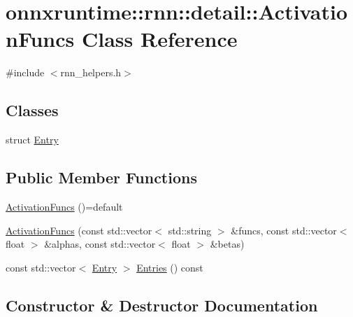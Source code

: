 \hypertarget{classonnxruntime_1_1rnn_1_1detail_1_1ActivationFuncs}{}\section{onnxruntime\+:\+:rnn\+:\+:detail\+:\+:Activation\+Funcs Class Reference}
\label{classonnxruntime_1_1rnn_1_1detail_1_1ActivationFuncs}


{\ttfamily \#include $<$rnn\+\_\+helpers.\+h$>$}

\subsection*{Classes}
\begin{DoxyCompactItemize}
\item 
struct \mbox{\hyperlink{structonnxruntime_1_1rnn_1_1detail_1_1ActivationFuncs_1_1Entry}{Entry}}
\end{DoxyCompactItemize}
\subsection*{Public Member Functions}
\begin{DoxyCompactItemize}
\item 
\mbox{\hyperlink{classonnxruntime_1_1rnn_1_1detail_1_1ActivationFuncs_ad6498706d5d6739ca3163f313fba59e2}{Activation\+Funcs}} ()=default
\item 
\mbox{\hyperlink{classonnxruntime_1_1rnn_1_1detail_1_1ActivationFuncs_aa49e05e7eabe9da56ef58334cbc2b685}{Activation\+Funcs}} (const std\+::vector$<$ std\+::string $>$ \&funcs, const std\+::vector$<$ float $>$ \&alphas, const std\+::vector$<$ float $>$ \&betas)
\item 
const std\+::vector$<$ \mbox{\hyperlink{structonnxruntime_1_1rnn_1_1detail_1_1ActivationFuncs_1_1Entry}{Entry}} $>$ \mbox{\hyperlink{classonnxruntime_1_1rnn_1_1detail_1_1ActivationFuncs_a78943fde9c0efd6f544ff8727af701c7}{Entries}} () const
\end{DoxyCompactItemize}


\subsection{Constructor \& Destructor Documentation}
\mbox{\label{classonnxruntime_1_1rnn_1_1detail_1_1ActivationFuncs_ad6498706d5d6739ca3163f313fba59e2}} 
